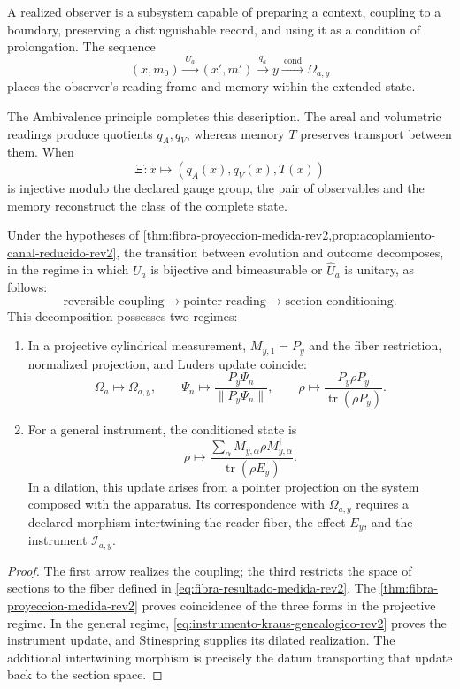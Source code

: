 A realized observer is a subsystem capable of preparing a context, coupling
to a boundary, preserving a distinguishable record, and using it as a
condition of prolongation. The sequence
\begin{equation}
 (x,m_0)
 \xrightarrow{\ U_a\ }(x',m')
 \xrightarrow{\ q_a\ }y
 \xrightarrow{\ \mathrm{cond}\ }\Omega_{a,y}
 \label{eq:secuencia-observador-rev2}
\end{equation}
places the observer's reading frame and memory within the extended state.

The Ambivalence principle completes this description. The areal and
volumetric readings produce quotients \(q_A,q_V\), whereas memory
\(T\) preserves transport between them. When
\[
 \Xi:x\longmapsto(q_A(x),q_V(x),T(x))
\]
is injective modulo the declared gauge group, the pair of observables and
the memory reconstruct the class of the complete state.

\begin{theorem}
\label{thm:descomposicion-medicion-rev2}
Under the hypotheses of
\cref{thm:fibra-proyeccion-medida-rev2,prop:acoplamiento-canal-reducido-rev2}, the
transition between evolution and outcome decomposes, in the regime in which
\(U_a\) is bijective and bimeasurable or \(\widehat U_a\) is unitary, as follows:
\[
 \text{reversible coupling}
 \longrightarrow
 \text{pointer reading}
 \longrightarrow
 \text{section conditioning}.
\]
This decomposition possesses two regimes:
\begin{enumerate}
\item In a projective cylindrical measurement, \(M_{y,1}=P_y\) and the
fiber restriction, normalized projection, and Luders update coincide:
\[
 \Omega_a\longmapsto\Omega_{a,y},
 \qquad
 \Psi_n\longmapsto\frac{P_y\Psi_n}{\|P_y\Psi_n\|},
 \qquad
 \rho\longmapsto
 \frac{P_y\rho P_y}{\operatorname{tr}(\rho P_y)}.
\]
\item For a general instrument, the conditioned state is
\[
 \rho\longmapsto
 \frac{\sum_\alpha M_{y,\alpha}\rho M_{y,\alpha}^\dagger}
 {\operatorname{tr}(\rho E_y)}.
\]
In a dilation, this update arises from a pointer projection on the system
composed with the apparatus. Its correspondence with \(\Omega_{a,y}\) requires
a declared morphism intertwining the reader fiber, the effect
\(E_y\), and the instrument \(\mathcal I_{a,y}\).
\end{enumerate}
\end{theorem}

\begin{proof}
The first arrow realizes the coupling; the third restricts the space of
sections to the fiber defined in \eqref{eq:fibra-resultado-medida-rev2}. The
\cref{thm:fibra-proyeccion-medida-rev2} proves coincidence of the three
forms in the projective regime. In the general regime,
\eqref{eq:instrumento-kraus-genealogico-rev2} proves the instrument update, and
Stinespring supplies its dilated realization. The additional intertwining
morphism is precisely the datum transporting that
update back to the section space.
\end{proof}

